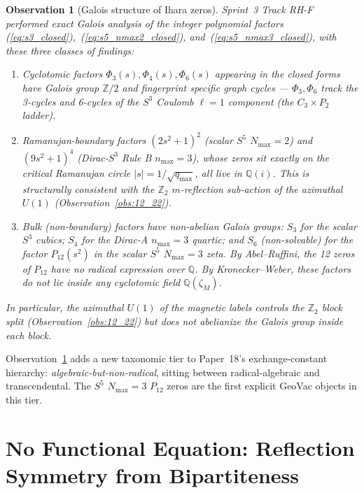 \documentclass[11pt]{article}
\newtheorem{observation}{Observation}
\begin{document}
\begin{observation}[Galois structure of Ihara zeros]
\label{obs:galois}
Sprint~3 Track RH-F performed exact Galois analysis of the integer
polynomial factors (\ref{eq:s3_closed}),~(\ref{eq:s5_nmax2_closed}),
and~(\ref{eq:s5_nmax3_closed}), with these three classes of findings:
\begin{enumerate}
\item Cyclotomic factors $\Phi_3(s), \Phi_4(s), \Phi_6(s)$ appearing
  in the closed forms have Galois group $\mathbb{Z}/2$ and fingerprint
  specific graph cycles --- $\Phi_3, \Phi_6$ track the 3-cycles and
  6-cycles of the $S^3$ Coulomb $\ell=1$ component (the
  $C_3 \times P_2$ ladder).
\item Ramanujan-boundary factors $(2s^2+1)^2$ (scalar $S^5$
  $N_{\max}=2$) and $(9s^2+1)^4$ (Dirac-$S^3$ Rule B $n_{\max}=3$),
  whose zeros sit exactly on the critical Ramanujan circle
  $|s| = 1/\sqrt{q_{\max}}$, all live in $\mathbb{Q}(i)$. This is
  structurally consistent with the $\mathbb{Z}_2$
  $m$-reflection sub-action of the azimuthal $U(1)$
  (Observation~\ref{obs:12_22}).
\item Bulk (non-boundary) factors have non-abelian Galois groups:
  $S_3$ for the scalar $S^3$ cubics; $S_4$ for the Dirac-A
  $n_{\max}=3$ quartic; and $S_6$ (non-solvable) for the factor
  $P_{12}(s^2)$ in the scalar $S^5$ $N_{\max}=3$ zeta. By
  Abel--Ruffini, the 12 zeros of $P_{12}$ have no radical
  expression over $\mathbb{Q}$. By Kronecker--Weber, these factors
  do not lie inside any cyclotomic field $\mathbb{Q}(\zeta_M)$.
\end{enumerate}
In particular, the azimuthal $U(1)$ of the magnetic labels controls the $\mathbb{Z}_2$
\emph{block split} (Observation~\ref{obs:12_22}) but does not
abelianize the Galois group inside each block.
\end{observation}

Observation~\ref{obs:galois} adds a new taxonomic tier to Paper~18's
exchange-constant hierarchy: \emph{algebraic-but-non-radical}, sitting
between radical-algebraic and transcendental. The $S^5$ $N_{\max}=3$
$P_{12}$ zeros are the first explicit GeoVac objects in this tier.

\section{No Functional Equation: Reflection Symmetry from Bipartiteness}
\label{sec:functional_equation}
\end{document}
